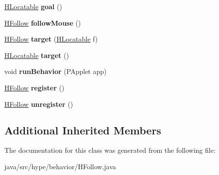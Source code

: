 \begin{DoxyCompactItemize}
\item 
\hypertarget{classhype_1_1behavior_1_1_h_follow_a21f6c5cf8483ac7836d74692730f31df}{\hyperlink{interfacehype_1_1interfaces_1_1_h_locatable}{H\-Locatable} {\bfseries goal} ()}\label{classhype_1_1behavior_1_1_h_follow_a21f6c5cf8483ac7836d74692730f31df}

\item 
\hypertarget{classhype_1_1behavior_1_1_h_follow_a022ccf3abb98107504567513e8e14b6b}{\hyperlink{classhype_1_1behavior_1_1_h_follow}{H\-Follow} {\bfseries follow\-Mouse} ()}\label{classhype_1_1behavior_1_1_h_follow_a022ccf3abb98107504567513e8e14b6b}

\item 
\hypertarget{classhype_1_1behavior_1_1_h_follow_a39deb7437d22b1c953c1f95182ff1615}{\hyperlink{classhype_1_1behavior_1_1_h_follow}{H\-Follow} {\bfseries target} (\hyperlink{interfacehype_1_1interfaces_1_1_h_locatable}{H\-Locatable} f)}\label{classhype_1_1behavior_1_1_h_follow_a39deb7437d22b1c953c1f95182ff1615}

\item 
\hypertarget{classhype_1_1behavior_1_1_h_follow_a27d358cfb6ed4c1d21685c202ef19827}{\hyperlink{interfacehype_1_1interfaces_1_1_h_locatable}{H\-Locatable} {\bfseries target} ()}\label{classhype_1_1behavior_1_1_h_follow_a27d358cfb6ed4c1d21685c202ef19827}

\item 
\hypertarget{classhype_1_1behavior_1_1_h_follow_aad6aec23d49277932ea3f924526482ed}{void {\bfseries run\-Behavior} (P\-Applet app)}\label{classhype_1_1behavior_1_1_h_follow_aad6aec23d49277932ea3f924526482ed}

\item 
\hypertarget{classhype_1_1behavior_1_1_h_follow_a16bee863c1466702886a8e0884fb92d0}{\hyperlink{classhype_1_1behavior_1_1_h_follow}{H\-Follow} {\bfseries register} ()}\label{classhype_1_1behavior_1_1_h_follow_a16bee863c1466702886a8e0884fb92d0}

\item 
\hypertarget{classhype_1_1behavior_1_1_h_follow_a7f1254633c3c04d687817ae0d8cec63c}{\hyperlink{classhype_1_1behavior_1_1_h_follow}{H\-Follow} {\bfseries unregister} ()}\label{classhype_1_1behavior_1_1_h_follow_a7f1254633c3c04d687817ae0d8cec63c}

\end{DoxyCompactItemize}
\subsection*{Additional Inherited Members}


The documentation for this class was generated from the following file\-:\begin{DoxyCompactItemize}
\item 
java/src/hype/behavior/H\-Follow.\-java\end{DoxyCompactItemize}
